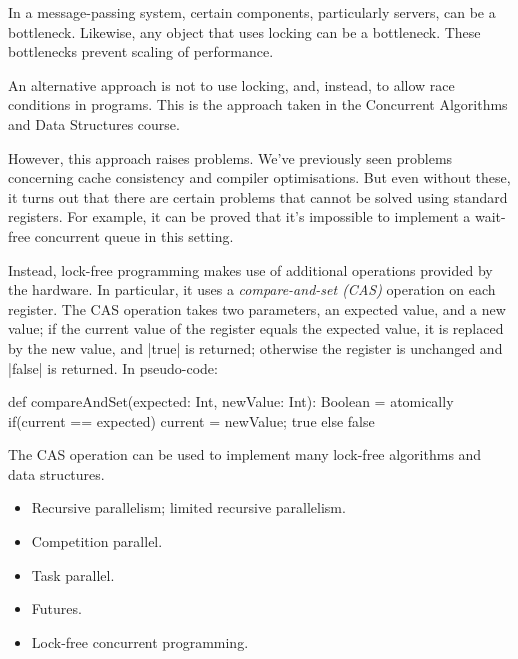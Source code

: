 \documentclass[notes,color]{sepslide0}
\begin{document}

\begin{slide}

In a message-passing system, certain components, particularly servers, can be
a bottleneck.  Likewise, any object that uses locking can be a bottleneck.
These bottlenecks prevent scaling of performance.

An alternative approach is not to use locking, and, instead, to allow race
conditions in programs.  This is the approach taken in the Concurrent
Algorithms and Data Structures course.

However, this approach raises problems.  We've previously seen problems
concerning cache consistency and compiler optimisations.  But even without
these, it turns out that there are certain problems that cannot be solved
using standard registers.  For example, it can be proved that it's impossible
to implement a wait-free concurrent queue in this setting.
\end{slide}


\begin{slide}

Instead, lock-free programming makes use of additional operations provided by
the hardware.  In particular, it uses a \emph{compare-and-set (CAS)} operation
on each register.  The CAS operation takes two parameters, an expected value,
and a new value; if the current value of the register equals the expected
value, it is replaced by the new value, and |true| is returned; otherwise the
register is unchanged and |false| is returned.  In pseudo-code:
%
\begin{scala}
def compareAndSet(expected: Int, newValue: Int): Boolean = atomically{
  if(current == expected){ current = newValue; true } else false
}
\end{scala}

The CAS operation can be used to implement many lock-free algorithms and data
structures. 
\end{slide}




\begin{slide}

\begin{itemize}
\item
Recursive parallelism; limited recursive parallelism.

\item
Competition parallel.

\item 
Task parallel.

\item
Futures.

\item
Lock-free concurrent programming.
\end{itemize}
\end{slide}
\end{document}
